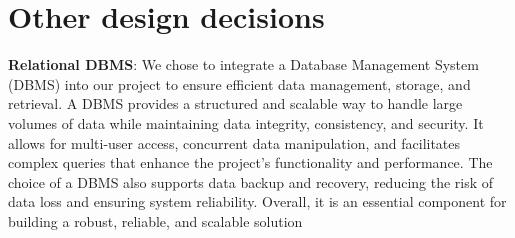 \section{Other design decisions}

\textbf{Relational DBMS}: 
We chose to integrate a Database Management System (DBMS) into our project to ensure efficient data management, storage, and retrieval. A DBMS provides a structured and scalable way to handle large volumes of data while maintaining data integrity, consistency, and security. It allows for multi-user access, concurrent data manipulation, and facilitates complex queries that enhance the project's functionality and performance. The choice of a DBMS also supports data backup and recovery, reducing the risk of data loss and ensuring system reliability. Overall, it is an essential component for building a robust, reliable, and scalable solution
